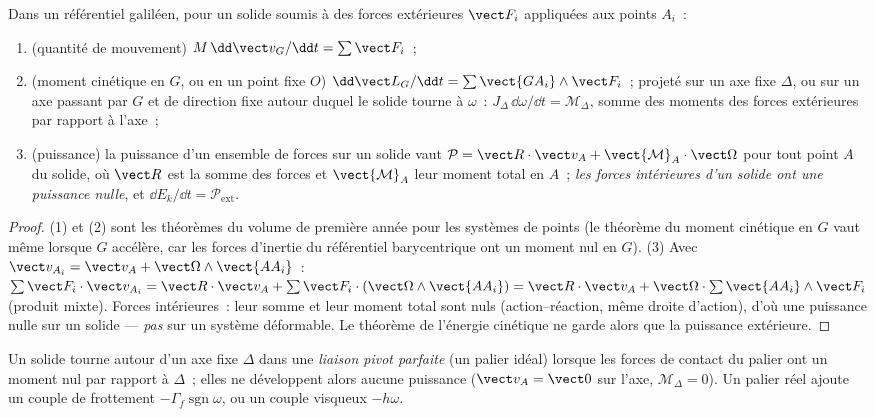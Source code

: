 \begin{theorem}\label{thm:b2:rigid-body-mechanics:laws}
Dans un référentiel galiléen, pour un solide soumis à des forces extérieures $\vect F_i$
appliquées aux points $A_i$~:
\begin{enumerate}
  \item (quantité de mouvement) $M\,\dd\vect v_G/\dd t = \sum\vect F_i$~;
  \item (moment cinétique en $G$, ou en un point fixe $O$)
        $\dd\vect L_G/\dd t = \sum\vect{GA_i}\wedge\vect F_i$~; projeté sur
        un axe fixe $\Delta$, ou sur un axe passant par $G$ et de direction
        fixe autour duquel le solide tourne à $\omega$~:
        $J_\Delta\,\dd\omega/\dd t = \mathcal M_\Delta$, somme des
        moments des forces extérieures par rapport à l'axe~;
  \item (puissance) la puissance d'un ensemble de forces sur un solide vaut
        $\mathcal P = \vect R\cdot\vect v_A + \vect{\mathcal M}_A\cdot
        \vect\Omega$ pour tout point $A$ du solide, où $\vect R$ est la
        somme des forces et $\vect{\mathcal M}_A$ leur moment total
        en $A$~; \emph{les forces intérieures d'un solide ont une puissance
        nulle}, et $\dd E_k/\dd t = \mathcal P_{\text{ext}}$.
\end{enumerate}
\end{theorem}

\begin{proof}
(1) et (2) sont les théorèmes du volume de première année pour les systèmes de points
(le théorème du moment cinétique en $G$ vaut même lorsque $G$
accélère, car les forces d'inertie du référentiel barycentrique ont un moment
nul en $G$). (3) Avec $\vect v_{A_i} = \vect v_A + \vect\Omega
\wedge\vect{AA_i}$~: $\sum\vect F_i\cdot\vect v_{A_i} = \vect R\cdot\vect v_A
+ \sum\vect F_i\cdot(\vect\Omega\wedge\vect{AA_i}) = \vect R\cdot\vect v_A +
\vect\Omega\cdot\sum\vect{AA_i}\wedge\vect F_i$ (produit mixte). Forces
intérieures~: leur somme et leur moment total sont nuls (action--réaction, même
droite d'action), d'où une puissance nulle sur un solide --- \emph{pas} sur un
système déformable. Le théorème de l'énergie cinétique ne garde alors que la puissance extérieure.
\end{proof}

\begin{definition}\label{def:b2:rigid-body-mechanics:pivot}
Un solide tourne autour d'un axe fixe $\Delta$ dans une \emph{liaison pivot
parfaite} (un palier idéal) lorsque les forces de contact du palier ont un
moment nul par rapport à $\Delta$~; elles ne développent alors aucune puissance ($\vect v_A = \vect 0$
sur l'axe, $\mathcal M_\Delta = 0$). Un palier réel ajoute un couple de
frottement $-\Gamma_f\operatorname{sgn}\omega$, ou un couple visqueux $-h\omega$.
\end{definition}

